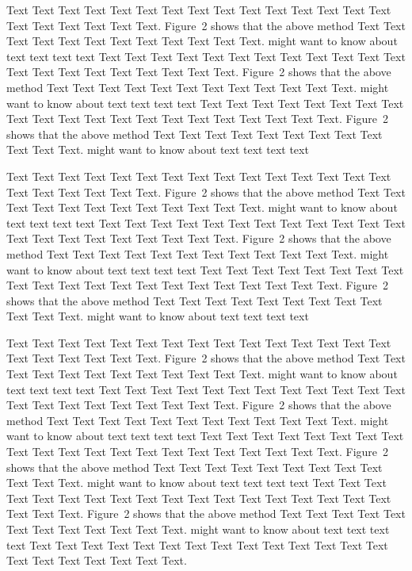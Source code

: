\documentclass{bioinfo}
\begin{document}
\begin{methods}
	Text Text Text Text Text Text  Text Text Text Text Text Text Text
	Text Text  Text Text Text Text Text Text.
	Figure~2\vphantom{\ref{fig:02}} shows that the above method  Text
	Text Text Text  Text Text Text Text Text Text  Text Text.
	\citealp{Boffelli03} might want to know about  text text text text
	Text Text Text Text Text Text  Text Text Text Text Text Text Text
	Text Text  Text Text Text Text Text Text.
	Figure~2\vphantom{\ref{fig:02}} shows that the above method  Text
	Text Text Text  Text Text Text Text Text Text  Text Text.
	\citealp{Boffelli03} might want to know about  text text text text
	Text Text Text Text Text Text Text Text Text Text Text Text Text
	Text Text  Text Text Text Text Text Text.
	Figure~2\vphantom{\ref{fig:02}} shows that the above method  Text
	Text Text Text  Text Text Text Text Text Text  Text Text.
	\citealp{Boffelli03} might want to know about  text text text text


	Text Text Text Text Text Text  Text Text Text Text Text Text Text
	Text Text  Text Text Text Text Text Text.
	Figure~2\vphantom{\ref{fig:02}} shows that the above method  Text
	Text Text Text  Text Text Text Text Text Text  Text Text.
	\citealp{Boffelli03} might want to know about  text text text text
	Text Text Text Text Text Text  Text Text Text Text Text Text Text
	Text Text  Text Text Text Text Text Text.
	Figure~2\vphantom{\ref{fig:02}} shows that the above method  Text
	Text Text Text  Text Text Text Text Text Text  Text Text.
	\citealp{Boffelli03} might want to know about  text text text text
	Text Text Text Text Text Text Text Text Text Text Text Text Text
	Text Text  Text Text Text Text Text Text.
	Figure~2\vphantom{\ref{fig:02}} shows that the above method  Text
	Text Text Text  Text Text Text Text Text Text  Text Text.
	\citealp{Boffelli03} might want to know about  text text text text

	Text Text Text Text Text Text  Text Text Text Text Text Text Text
	Text Text  Text Text Text Text Text Text.
	Figure~2\vphantom{\ref{fig:02}} shows that the above method  Text
	Text Text Text  Text Text Text Text Text Text  Text Text.
	\citealp{Boffelli03} might want to know about  text text text text
	Text Text Text Text Text Text  Text Text Text Text Text Text Text
	Text Text  Text Text Text Text Text Text.
	Figure~2\vphantom{\ref{fig:02}} shows that the above method  Text
	Text Text Text  Text Text Text Text Text Text  Text Text.
	\citealp{Boffelli03} might want to know about  text text text text
	Text Text Text Text Text Text Text Text Text Text Text Text Text
	Text Text  Text Text Text Text Text Text.
	Figure~2\vphantom{\ref{fig:02}} shows that the above method  Text
	Text Text Text  Text Text Text Text Text Text  Text Text.
	\citealp{Boffelli03} might want to know about  text text text text
	Text Text Text Text Text Text  Text Text Text Text Text Text Text
	Text Text  Text Text Text Text Text Text.
	Figure~2\vphantom{\ref{fig:02}} shows that the above method  Text
	Text Text Text  Text Text Text Text Text Text  Text Text.
	\citealp{Boffelli03} might want to know about  text text text text
	Text Text Text Text Text Text Text Text Text Text Text Text Text
	Text Text  Text Text Text Text Text Text.



\end{methods}
\end{document}
